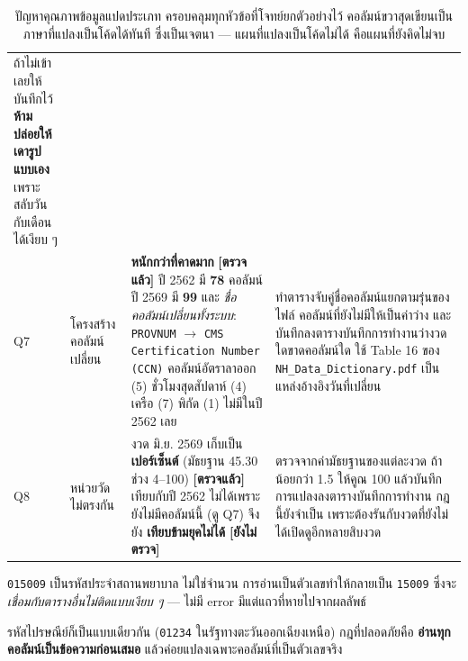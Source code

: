 \documentclass[11pt,a4paper]{article}
\newcommand{\code}[1]{\texttt{#1}}
\newcommand{\ok}{\textcolor{dw}{\textbf{[ตรวจแล้ว]}}}
\newcommand{\tbc}{\textcolor{etl}{\textbf{[ยังไม่ตรวจ]}}}
\begin{document}
\begin{table}[H]
\begin{adjustbox}{max width=\linewidth}
\begin{tabular}{L{0.8cm} L{3.0cm} L{6.2cm} L{6.4cm}}
  ถ้าไม่เข้าเลยให้บันทึกไว้ \textbf{ห้ามปล่อยให้เดารูปแบบเอง}
  เพราะสลับวันกับเดือนได้เงียบ ๆ \\
\addlinespace
Q7 & โครงสร้างคอลัมน์เปลี่ยน &
  \textbf{หนักกว่าที่คาดมาก} \ok{} ปี 2562 มี \textbf{78} คอลัมน์ ปี 2569 มี
  \textbf{99} และ \emph{ชื่อคอลัมน์เปลี่ยนทั้งระบบ}: \code{PROVNUM} $\to$
  \code{CMS Certification Number (CCN)} คอลัมน์อัตราลาออก (5) ชั่วโมงสุดสัปดาห์ (4)
  เครือ (7) พิกัด (1) ไม่มีในปี 2562 เลย &
  ทำตารางจับคู่ชื่อคอลัมน์แยกตามรุ่นของไฟล์ คอลัมน์ที่ยังไม่มีให้เป็นค่าว่าง
  และบันทึกลงตารางบันทึกการทำงานว่างวดใดขาดคอลัมน์ใด
  ใช้ Table 16 ของ \code{NH_Data_Dictionary.pdf} เป็นแหล่งอ้างอิงวันที่เปลี่ยน \\
\addlinespace
Q8 & หน่วยวัดไม่ตรงกัน &
  งวด มิ.ย. 2569 เก็บเป็น \textbf{เปอร์เซ็นต์} (มัธยฐาน 45.30 ช่วง 4--100) \ok{}
  เทียบกับปี 2562 ไม่ได้เพราะยังไม่มีคอลัมน์นี้ (ดู Q7)
  จึงยัง \textbf{เทียบข้ามยุคไม่ได้} \tbc{} &
  ตรวจจากค่ามัธยฐานของแต่ละงวด ถ้าน้อยกว่า 1.5 ให้คูณ 100
  แล้วบันทึกการแปลงลงตารางบันทึกการทำงาน กฎนี้ยังจำเป็น
  เพราะต้องรันกับงวดที่ยังไม่ได้เปิดดูอีกหลายสิบงวด \\
\bottomrule
\end{tabular}
\end{adjustbox}
\caption{ปัญหาคุณภาพข้อมูลแปดประเภท ครอบคลุมทุกหัวข้อที่โจทย์ยกตัวอย่างไว้ คอลัมน์ขวาสุดเขียนเป็นภาษาที่แปลงเป็นโค้ดได้ทันที ซึ่งเป็นเจตนา --- แผนที่แปลงเป็นโค้ดไม่ได้ คือแผนที่ยังคิดไม่จบ}
\end{table}

\begin{badbox}[title={อย่าอ่าน CCN เป็นตัวเลข แม้แต่ครั้งเดียว}]
\code{015009} เป็นรหัสประจำสถานพยาบาล ไม่ใช่จำนวน การอ่านเป็นตัวเลขทำให้กลายเป็น
\code{15009} ซึ่งจะ \emph{เชื่อมกับตารางอื่นไม่ติดแบบเงียบ ๆ} --- ไม่มี error
มีแต่แถวที่หายไปจากผลลัพธ์

\vspace{0.3em}
รหัสไปรษณีย์ก็เป็นแบบเดียวกัน (\code{01234} ในรัฐทางตะวันออกเฉียงเหนือ)
กฎที่ปลอดภัยคือ \textbf{อ่านทุกคอลัมน์เป็นข้อความก่อนเสมอ}
แล้วค่อยแปลงเฉพาะคอลัมน์ที่เป็นตัวเลขจริง
\end{badbox}
\end{document}
